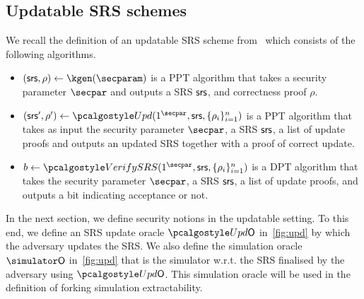 

\subsection{Updatable SRS schemes}\label{def:upd-scheme}
We recall the definition of an updatable SRS scheme from~\cite{C:GKMMM18} which consists of the following algorithms.

\begin{itemize}
	\item
	$(\srs,\rho) \leftarrow \kgen(\secparam)$ is a PPT algorithm that takes a security parameter $\secpar$ and outputs a SRS $\mathsf{srs}$, and correctness proof $\rho$.
	\item
	$ (\srs',\rho') \leftarrow \upd(1^\secpar,\srs,\{\rho_i \}_{i=1}^n)$ is a PPT algorithm that takes as input the security parameter $\secpar$, a SRS $\mathsf{srs}$, a list of update proofs and outputs an updated SRS together with a proof of correct update. 
	\item
	$b \leftarrow \verifyCRS(1^\secpar,\srs,\{\rho_i \}_{i=1}^n)$ is a DPT algorithm that takes the security parameter $\secpar$, a SRS $\mathsf{srs}$, a list of update proofs, and outputs a bit indicating acceptance or not.
\end{itemize}

In the next section, we define security notions in the updatable setting. To this end, we define an SRS update oracle $\initU$ in~\cref{fig:upd} by which the adversary updates the SRS. We also define the simulation oracle $\simO$ in~\cref{fig:upd} that is the simulator w.r.t. the SRS finalised by the adversary using $\initU$. This simulation oracle will be used in the definition of forking simulation extractability.

